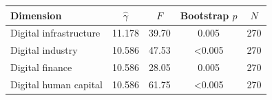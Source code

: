 \begin{tabular}{lcccc}
\toprule
Dimension & $\hat{\gamma}$ & $F$ & Bootstrap $p$ & $N$ \\
\midrule
Digital infrastructure & 11.178 & 39.70 & 0.005 & 270 \\
Digital industry & 10.586 & 47.53 & <0.005 & 270 \\
Digital finance & 10.586 & 28.05 & 0.005 & 270 \\
Digital human capital & 10.586 & 61.75 & <0.005 & 270 \\
\bottomrule
\end{tabular}